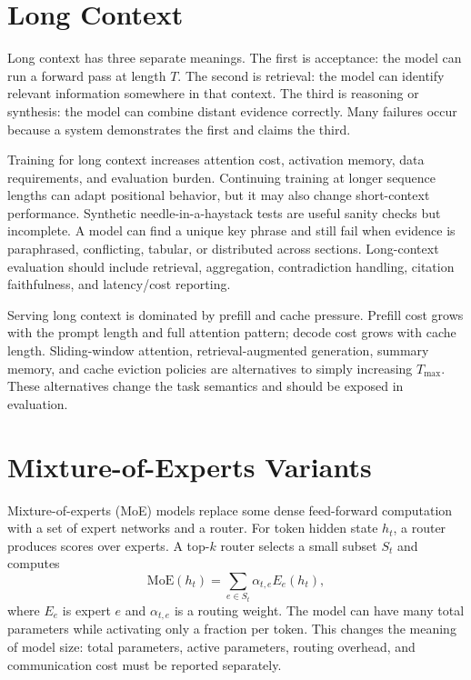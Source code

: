 \section{Long Context}
\label{sec:llama-long-context}

Long context has three separate meanings. The first is acceptance: the model can run a forward pass at length $T$. The second is retrieval: the model can identify relevant information somewhere in that context. The third is reasoning or synthesis: the model can combine distant evidence correctly. Many failures occur because a system demonstrates the first and claims the third.

Training for long context increases attention cost, activation memory, data requirements, and evaluation burden. Continuing training at longer sequence lengths can adapt positional behavior, but it may also change short-context performance. Synthetic needle-in-a-haystack tests are useful sanity checks but incomplete. A model can find a unique key phrase and still fail when evidence is paraphrased, conflicting, tabular, or distributed across sections. Long-context evaluation should include retrieval, aggregation, contradiction handling, citation faithfulness, and latency/cost reporting.

Serving long context is dominated by prefill and cache pressure. Prefill cost grows with the prompt length and full attention pattern; decode cost grows with cache length. Sliding-window attention, retrieval-augmented generation, summary memory, and cache eviction policies are alternatives to simply increasing $T_{\max}$. These alternatives change the task semantics and should be exposed in evaluation.

\section{Mixture-of-Experts Variants}
\label{sec:llama-moe-variants}

Mixture-of-experts (MoE) models replace some dense feed-forward computation with a set of expert networks and a router. For token hidden state $h_t$, a router produces scores over experts. A top-$k$ router selects a small subset $S_t$ and computes
\begin{equation}
  \mathrm{MoE}(h_t)
  = \sum_{e\in S_t} \alpha_{t,e} E_e(h_t),
\end{equation}
where $E_e$ is expert $e$ and $\alpha_{t,e}$ is a routing weight. The model can have many total parameters while activating only a fraction per token. This changes the meaning of model size: total parameters, active parameters, routing overhead, and communication cost must be reported separately.

